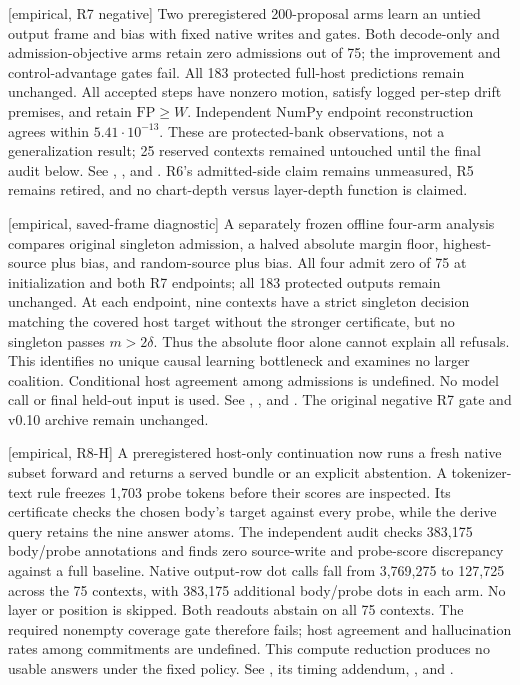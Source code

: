 \documentclass[11pt]{article}
\newcommand{\status}[1]{\textsf{[#1]}}
\begin{document}
\status{empirical, R7 negative} Two preregistered 200-proposal arms
learn an untied output frame and bias with fixed native writes and gates.
Both decode-only and admission-objective arms retain zero admissions out
of 75; the improvement and control-advantage gates fail. All 183 protected
full-host predictions remain unchanged. All accepted steps have nonzero
motion, satisfy logged per-step drift premises, and retain $\mathrm{FP}\ge W$.
Independent NumPy endpoint reconstruction agrees within $5.41\cdot10^{-13}$.
These are protected-bank observations, not a generalization result; 25
reserved contexts remained untouched until the final audit below. See
, , and
. R6's admitted-side claim remains
unmeasured, R5 remains retired, and no chart-depth versus layer-depth
function is claimed.

\status{empirical, saved-frame diagnostic} A separately frozen offline
four-arm analysis compares original singleton admission, a halved absolute
margin floor, highest-source plus bias, and random-source plus bias.
All four admit zero of 75 at initialization and both R7 endpoints; all
183 protected outputs remain unchanged. At each endpoint, nine contexts
have a strict singleton decision matching the covered host target without
the stronger certificate, but no singleton passes $m>2\delta$. Thus the
absolute floor alone cannot explain all refusals. This identifies no unique
causal learning bottleneck and examines no larger coalition. Conditional
host agreement among admissions is undefined. No model call or final
held-out input is used. See
,
, and
.
The original negative R7 gate and v0.10 archive remain unchanged.

\status{empirical, R8-H} A preregistered host-only continuation now runs a
fresh native subset forward and returns a served bundle or an explicit
abstention. A tokenizer-text rule freezes 1,703 probe tokens before their
scores are inspected. Its certificate checks the chosen body's target
against every probe, while the derive query retains the nine answer atoms.
The independent audit checks 383,175 body/probe annotations and finds zero
source-write and probe-score discrepancy against a full baseline. Native
output-row dot calls fall from 3,769,275 to 127,725 across the 75 contexts,
with 383,175 additional body/probe dots in each arm. No layer or position
is skipped. Both readouts abstain on all 75 contexts. The required nonempty
coverage gate therefore fails; host agreement and hallucination rates among
commitments are undefined. This compute reduction produces no usable
answers under the fixed policy. See
, its timing addendum,
, and .
\end{document}
